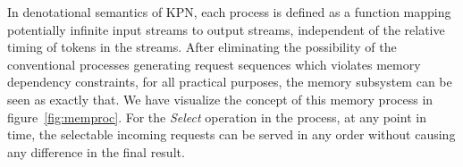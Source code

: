 In denotational semantics of KPN, each process is defined as a function mapping potentially infinite input streams to output streams, independent of the relative timing
of tokens in the streams.
After eliminating the possibility of the conventional
processes generating request sequences which violates memory dependency constraints, for all practical purposes, the memory subsystem can be seen as exactly that. 
We have visualize the concept of this memory process in  figure~\ref{fig:memproc}. 
For the \textit{Select} operation in the process, at any point in time, the selectable incoming requests can be served in
any order without causing any difference in the final result. 







%

